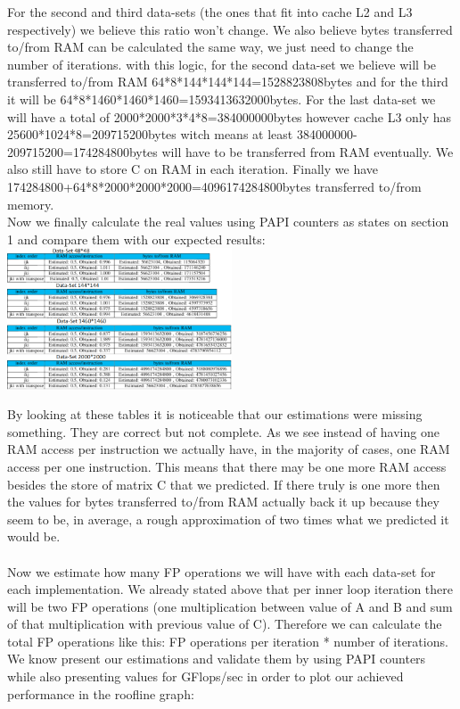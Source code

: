 \documentclass[journal]{IEEEtran}
\begin{document}
For the second and third data-sets (the ones that fit into cache L2 and L3 respectively) we believe this ratio won't change. We also believe bytes transferred to/from RAM can be  calculated the same way, we just need to change the number of iterations. with this logic, for the second data-set we believe will be transferred to/from RAM 64*8*144*144*144=1528823808bytes and for the third it will be 64*8*1460*1460*1460=1593413632000bytes. For the last data-set we will have a total of 2000*2000*3*4*8=384000000bytes however cache L3 only has 25600*1024*8=209715200bytes witch means at least 384000000-209715200=174284800bytes will have to be transferred from RAM eventually. We also still have to store C on RAM in each iteration. Finally we have 174284800+64*8*2000*2000*2000=4096174284800bytes transferred to/from memory.\\
Now we finally calculate the real values using PAPI counters as states on section 1 and compare them with our expected results:\\

\includegraphics[width=0.50\textwidth, left]{tebelinhas.png}

By looking at these tables it is noticeable that our estimations were missing something. They are correct but not complete. As we see instead of having one RAM access per instruction we actually have, in the majority of cases, one RAM access per one instruction. This means that there may be one more RAM access besides the store of matrix C that we predicted. If there truly is one more then the values for bytes transferred to/from RAM actually back it up because they seem to be, in average, a rough approximation of two times what we predicted it would be.\\
\\
Now we estimate how many FP operations we will have with each data-set for each implementation. We already stated above that per inner loop iteration there will be two FP operations (one multiplication between value of A and B and sum of that multiplication with previous value of C). Therefore we can calculate the total FP operations like this: FP operations per iteration * number of iterations. We know present our estimations and validate them by using PAPI counters while also presenting values for GFlops/sec in order to plot our achieved performance in the roofline graph:
\end{document}

